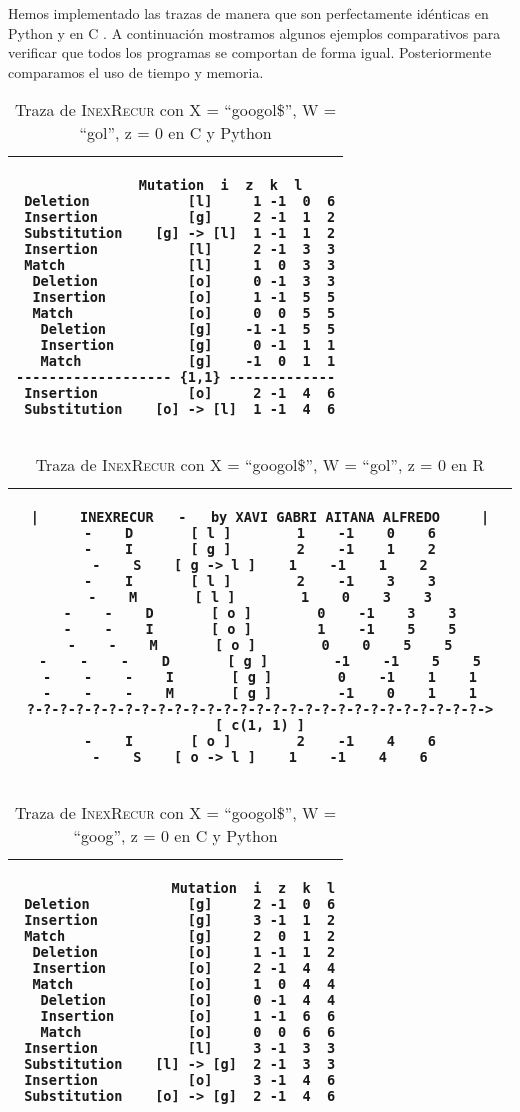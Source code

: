 \documentclass{article}
\newcommand{\tempcaption}{}
\newenvironment{code}[4]{
\begin{table}[h!]
\gdef\tempcaption{Traza de \textsc{InexRecur} con X = ``#1'', W = ``#2'', z = #3 en #4}
\centering
\begin{tabular}{|c|}
\hline }
{\\\hline
\end{tabular}
\caption{\protect\tempcaption}
\end{table} }
\newcommand{\C}{C }
\newcommand{\R}{R }
\newcommand{\python}{Python }
\begin{document}
Hemos implementado las trazas de manera que son perfectamente
idénticas en \python y en \C. A continuación mostramos algunos
ejemplos comparativos para verificar que todos los programas se
comportan de forma igual. Posteriormente comparamos el uso de
tiempo y memoria.
\\
\begin{code}{googol\$}{gol}{0}{\C y \python}
\begin{lstlisting}
		   Mutation  i  z  k  l
 Deletion            [l]     1 -1  0  6
 Insertion           [g]     2 -1  1  2
 Substitution    [g] -> [l]  1 -1  1  2
 Insertion           [l]     2 -1  3  3
 Match               [l]     1  0  3  3
  Deletion           [o]     0 -1  3  3
  Insertion          [o]     1 -1  5  5
  Match              [o]     0  0  5  5
   Deletion          [g]    -1 -1  5  5
   Insertion         [g]     0 -1  1  1
   Match             [g]    -1  0  1  1
------------------- {1,1} -------------
 Insertion           [o]     2 -1  4  6
 Substitution    [o] -> [l]  1 -1  4  6
\end{lstlisting}
\end{code}
\phantom{}
\vfill
\begin{code}{googol\$}{gol}{0}{\R}
\begin{lstlisting}
|     INEXRECUR   -   by XAVI GABRI AITANA ALFREDO     |
-    D       [ l ]        1    -1    0    6
-    I       [ g ]        2    -1    1    2
-    S    [ g -> l ]    1    -1    1    2
-    I       [ l ]        2    -1    3    3
-    M       [ l ]        1    0    3    3
-    -    D       [ o ]        0    -1    3    3
-    -    I       [ o ]        1    -1    5    5
-    -    M       [ o ]        0    0    5    5
-    -    -    D       [ g ]        -1    -1    5    5
-    -    -    I       [ g ]        0    -1    1    1
-    -    -    M       [ g ]        -1    0    1    1
?-?-?-?-?-?-?-?-?-?-?-?-?-?-?-?-?-?-?-?-?-?-?-?-?-?-?-?->  [ c(1, 1) ]
-    I       [ o ]        2    -1    4    6
-    S    [ o -> l ]    1    -1    4    6
\end{lstlisting}
\end{code}
\vfill
\clearpage
\phantom{}
\vspace{1cm}
\begin{code}{googol\$}{goog}{0}{\C y \python}
\begin{lstlisting}
                   Mutation  i  z  k  l
 Deletion            [g]     2 -1  0  6
 Insertion           [g]     3 -1  1  2
 Match               [g]     2  0  1  2
  Deletion           [o]     1 -1  1  2
  Insertion          [o]     2 -1  4  4
  Match              [o]     1  0  4  4
   Deletion          [o]     0 -1  4  4
   Insertion         [o]     1 -1  6  6
   Match             [o]     0  0  6  6
 Insertion           [l]     3 -1  3  3
 Substitution    [l] -> [g]  2 -1  3  3
 Insertion           [o]     3 -1  4  6
 Substitution    [o] -> [g]  2 -1  4  6
\end{lstlisting}
\end{code}
\end{document}
